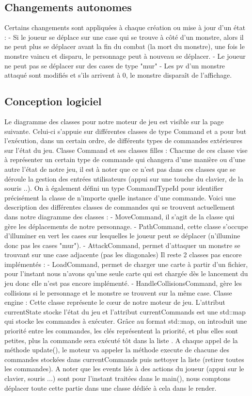 \documentclass[a4paper,12pt]{article}
\begin{document}
\subsection{Changements autonomes}

Certains changements sont appliquées à chaque création ou mise à jour d'un état :
- Si le joueur se déplace sur une case qui se trouve à côté d'un monstre, alors il ne peut plus se déplacer avant la fin du combat (la mort du monstre), une fois le monstre vaincu et disparu, le personnage peut à nouveau se déplacer.
- Le joueur ne peut pas se déplacer sur des cases de type "mur"
- Les pv d'un monstre attaqué sont modifiés et s'ils arrivent à 0, le monstre disparaît de l'affichage.

\subsection{Conception logiciel}

Le diagramme des classes pour notre moteur de jeu est visible sur la page suivante. Celui-ci s'appuie sur différentes classes de type Command et a pour but l’exécution, dans un certain ordre, de différents types de commandes extérieures sur l'état du jeu.
\bigbreak
Classe Command et ses classes filles :
Chacune de ces classe vise à représenter un certain type de commande qui changera d'une manière ou d'une autre l'état de notre jeu, il est à noter que ce n'est pas dans ces classes que se déroule la gestion des entrées utilisateurs (appui sur une touche du clavier, de la souris ..).
On à également défini un type CommandTypeId pour identifier précisément la classe de n'importe quelle instance d'une commande.
Voici une description des différentes classes de commandes qui se trouvent actuellement dans notre diagramme des classes :
- MoveCommand, il s'agit de la classe qui gère les déplacements de notre personnage.
- PathCommand, cette classe s'occupe d'illuminer en vert les cases sur lesquelles le joueur peut se déplacer (n'illumine donc pas les cases "mur").
- AttackCommand, permet d'attaquer un monstre se trouvant sur une case adjacente (pas les diagonales)
Il reste 2 classes pas encore implémentés :
- LoadCommand, permet de charger une carte à partir d'un fichier, pour l'instant nous n'avons qu'une seule carte qui est chargée dès le lancement du jeu donc elle n'est pas encore implémenté.
- HandleCollisionsCommand, gère les collisions si le personnage et le monstre se trouvent sur la même case.
\bigbreak
Classe engine :
Cette classe représente le cœur de notre moteur de jeu. L'attribut currentState stocke l'état du jeu et l'attribut currentCommands est une std::map qui stocke les commandes à exécuter.
Grâce au format std::map, on introduit une priorité entre les commandes, les clés représentent la priorité, et plus elles sont petites, plus la commande sera exécuté tôt dans la liste .
A chaque appel de la méthode update(), le moteur va appeler la méthode execute de chacune des commandes stockées dans currentCommands puis nettoyer la liste (retirer toutes les commandes).
\bigbreak
A noter que les events liés à des actions du joueur (appui sur le clavier, souris ...) sont pour l'instant traitées dans le main(), nous comptons déplacer toute cette partie dans une classe dédiée à cela dans le render.
\end{document}
